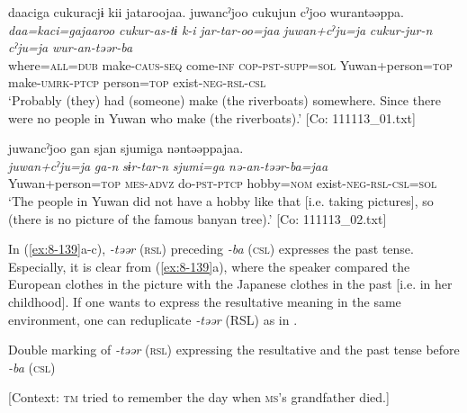 \ex
{\TM}
\glll  daaciga{\footnotemark} cukuracjɨ  kii  jataroojaa.      juwancˀjoo  cukujun  cˀjoo  wurantəəppa.\\
\textit{daa=kaci=gajaaroo}  \textit{cukur-as-tɨ}  \textit{k-i}  \textit{jar-tar-oo=jaa}      \textit{juwan+cˀju=ja}  \textit{cukur-jur-n}  \textit{cˀju=ja}  \textit{wur-an-təər-ba}\\
where=\textsc{all}=\textsc{dub}  make-\textsc{caus}-\textsc{seq}  come-\textsc{inf}  \textsc{cop}-\textsc{pst}-\textsc{supp}=\textsc{sol}   Yuwan+person=\textsc{top}  make-\textsc{umrk}-\textsc{ptcp}  person=\textsc{top}  exist-\textsc{neg}-\textsc{rsl}-\textsc{csl}\\
\glt ‘Probably (they) had (someone) make (the riverboats) somewhere. Since there were no people in Yuwan who make (the riverboats).’ [Co: 111113\_01.txt]


{\TM}
\glll  juwancˀjoo  gan  sjan  {\textbar}sjumi{\textbar}ga      nəntəəppajaa.\\
\textit{juwan+cˀju=ja}  \textit{ga-n}  \textit{sɨr-tar-n}  \textit{sjumi=ga}      \textit{nə-an-təər-ba=jaa}\\
Yuwan+person=\textsc{top}  \textsc{mes}-\textsc{advz}  do-\textsc{pst}-\textsc{ptcp}  hobby=\textsc{nom} exist-\textsc{neg}-\textsc{rsl}-\textsc{csl}=\textsc{sol}\\
\glt ‘The people in Yuwan did not have a hobby like that [i.e. taking pictures], so (there is no picture of the famous banyan tree).’ [Co: 111113\_02.txt]
\z
\z

In (\ref{ex:8-139}a-c), \textit{-təər} (\textsc{rsl}) preceding \textit{-ba} (\textsc{csl}) expresses the past tense. Especially, it is clear from (\ref{ex:8-139}a), where the speaker compared the European clothes in the picture with the Japanese clothes in the past [i.e. in her childhood]. If one wants to express the resultative meaning in the same environment, one can reduplicate \textit{-təər} (RSL) as in .

\ea\label{ex:8-140}
  Double marking of \textit{-təər} (\textsc{rsl}) expressing the resultative and the past tense before \textit{-ba} (\textsc{csl})

  [Context: \textsc{tm} tried to remember the day when \textsc{ms}’s grandfather died.]


